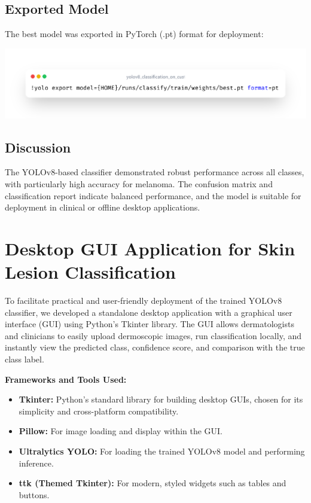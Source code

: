 \documentclass[a4paper,12pt]{report}
\begin{document}
\begin{spacing}{1.5}
    \subsection*{Exported Model}
    The best model was exported in PyTorch (.pt) format for deployment:
    \begin{center}
        \includegraphics[width=\textwidth]{code/export.png}
    \end{center}

    \subsection*{Discussion}
    The YOLOv8-based classifier demonstrated robust performance across all classes, with particularly high accuracy for melanoma. The confusion matrix and classification report indicate balanced performance, and the model is suitable for deployment in clinical or offline desktop applications.


    \newpage
    \section{Desktop GUI Application for Skin Lesion Classification}

    To facilitate practical and user-friendly deployment of the trained YOLOv8 classifier, we developed a standalone desktop application with a graphical user interface (GUI) using Python's Tkinter library. The GUI allows dermatologists and clinicians to easily upload dermoscopic images, run classification locally, and instantly view the predicted class, confidence score, and comparison with the true class label.
    
    \textbf{Frameworks and Tools Used:}
    \begin{itemize}
        \item \textbf{Tkinter:} Python's standard library for building desktop GUIs, chosen for its simplicity and cross-platform compatibility.
        \item \textbf{Pillow:} For image loading and display within the GUI.
        \item \textbf{Ultralytics YOLO:} For loading the trained YOLOv8 model and performing inference.
        \item \textbf{ttk (Themed Tkinter):} For modern, styled widgets such as tables and buttons.
    \end{itemize}
    

\end{spacing}
\end{document}
